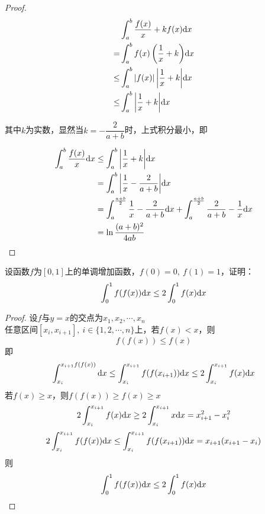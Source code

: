 \begin{proof}

    \begin{align*}
        & \int_{a}^{b}{\dfrac{f(x)}{x} + kf(x)}\mathrm{d} x \\
        = & \int_{a}^{b}{f(x) \left(\dfrac{1}{x} + k \right)}\mathrm{d} x \\
        \leq & \int_{a}^{b}{|f(x)| \left|\dfrac{1}{x} + k \right|}\mathrm{d} x \\
        \leq & \int_{a}^{b}{\left| \dfrac{1}{x} + k \right|}\mathrm{d} x
    \end{align*}

    其中$k$为实数，显然当$k = - \dfrac{2}{a+b}$时，上式积分最小，即

    \begin{align*}
        \int_{a}^{b}{\dfrac{f(x)}{x}}\mathrm{d} x & \leq \int_{a}^{b}{\left| \dfrac{1}{x} + k \right|}\mathrm{d} x \\  
        & = \int_{a}^{b}{\left| \dfrac{1}{x} - \dfrac{2}{a+b} \right|}\mathrm{d} x \\
        & = \int_{a}^{\frac{a+b}{2}}{\dfrac{1}{x} - \dfrac{2}{a+b}}\mathrm{d} x + \int_{a}^{\frac{a+b}{2}}{\dfrac{2}{a+b} - \dfrac{1}{x}}\mathrm{d} x \\
        & = \ln{\dfrac{(a+b)^2}{4ab}}
    \end{align*}

\end{proof}

\begin{proposition}

    设函数$f$为$[0,1]$上的单调增加函数，$f(0) = 0, \ f(1) = 1$，证明：
    $$\int_{0}^{1}{f(f(x))}\mathrm{d} x \leq 2\int_{0}^{1}{f(x)}\mathrm{d} x$$

\end{proposition}

\begin{proof}

    设$f$与$y = x$的交点为$x_1, x_2, \cdots , x_n$\\
    任意区间$[x_i, x_{i+1}], \ i \in \{1,2,\cdots,n\}$上，若$f(x) < x$，则
    $$f(f(x)) \leq f(x)$$
    即
    $$\int_{x_i}^{x_{i+1}{f(f(x))}}\mathrm{d} x \leq \int_{x_i}^{x_{i+1}}{f(f(x_{i+1}))}\mathrm{d} x \leq 2\int_{x_i}^{x_{i+1}}{f(x)}\mathrm{d} x$$
    若$f(x) \geq x$，则$f(f(x)) \geq f(x) \geq x$
    $$2\int_{x_i}^{x_{i+1}}{f(x)}\mathrm{d} x \geq 2\int_{x_i}^{x_{i+1}}{x}\mathrm{d} x = x_{i+1}^2 - x_i^2$$
    $$2\int_{x_i}^{x_{i+1}}{f(f(x))}\mathrm{d} x \leq \int_{x_i}^{x_{i+1}}{f(f(x_{i+1}))}\mathrm{d} x = x_{i+1}(x_{i+1} - x_i)$$
    则
    $$\int_{0}^{1}{f(f(x))}\mathrm{d} x \leq 2\int_{0}^{1}{f(x)}\mathrm{d} x$$

\end{proof}

